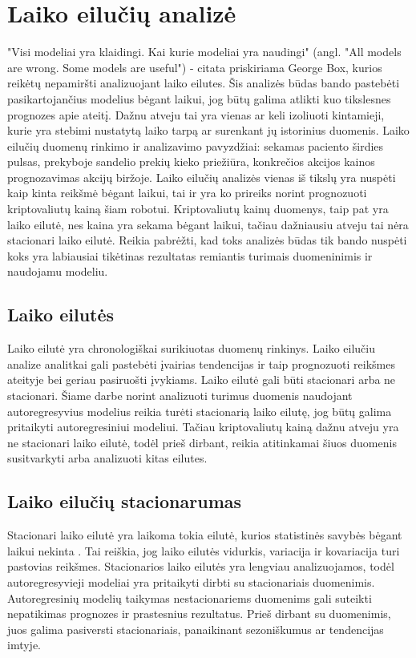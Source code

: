 \documentclass{VUMIFInfKursinis}
\begin{document}
\section{Laiko eilučių analizė}
"Visi modeliai yra klaidingi. Kai kurie modeliai yra naudingi" (angl. "All models are wrong. Some models are useful") - citata priskiriama George Box, kurios
reikėtų nepamiršti analizuojant laiko eilutes. Šis analizės būdas bando pastebėti pasikartojančius modelius bėgant laikui, jog būtų galima atlikti kuo tikslesnes
prognozes apie ateitį. 
Dažnu atveju tai yra vienas ar keli izoliuoti kintamieji, kurie yra stebimi nustatytą laiko tarpą ar surenkant jų istorinius duomenis. Laiko eilučių duomenų 
rinkimo ir analizavimo pavyzdžiai: sekamas paciento širdies pulsas, prekyboje sandelio prekių kieko priežiūra, konkrečios akcijos kainos prognozavimas akcijų biržoje. 
Laiko eilučių analizės vienas iš tikslų yra nuspėti kaip kinta reikšmė bėgant laikui, tai ir yra ko prireiks norint prognozuoti kriptovaliutų kainą šiam robotui. 
Kriptovaliutų kainų duomenys, taip pat yra laiko eilutė, nes kaina yra sekama bėgant laikui, tačiau dažniausiu atveju tai nėra stacionari laiko eilutė.
Reikia pabrėžti, kad toks analizės būdas tik bando nuspėti koks yra labiausiai tikėtinas rezultatas remiantis turimais duomeninimis ir naudojamu modeliu. 

\subsection {Laiko eilutės}
Laiko eilutė yra chronologiškai surikiuotas duomenų rinkinys. Laiko eilučiu analize analitkai gali pastebėti įvairias tendencijas ir taip prognozuoti reikšmes
ateityje bei geriau pasiruošti įvykiams. Laiko eilutė gali būti stacionari arba ne stacionari. Šiame darbe norint analizuoti turimus duomenis naudojant 
autoregresyvius modelius reikia turėti stacionarią laiko eilutę, jog būtų galima pritaikyti autoregresiniui modeliui. Tačiau kriptovaliutų kainą dažnu atveju yra
ne stacionari laiko eilutė, todėl prieš dirbant, reikia atitinkamai šiuos duomenis susitvarkyti arba analizuoti kitas eilutes.

\subsection {Laiko eilučių stacionarumas}
Stacionari laiko eilutė yra laikoma tokia eilutė, kurios statistinės savybės bėgant laikui nekinta \cite{nason2006stationary}. Tai reiškia, jog laiko eilutės vidurkis,
variacija ir kovariacija turi pastovias reikšmes. Stacionarios laiko eilutės yra lengviau analizuojamos, todėl autoregresyvieji modeliai yra pritaikyti dirbti su 
stacionariais duomenimis. Autoregresinių modelių taikymas nestacionariems duomenims gali suteikti nepatikimas prognozes ir prastesnius rezultatus. 
Prieš dirbant su duomenimis, juos galima pasiversti stacionariais, panaikinant sezoniškumus ar tendencijas imtyje.
\end{document}
